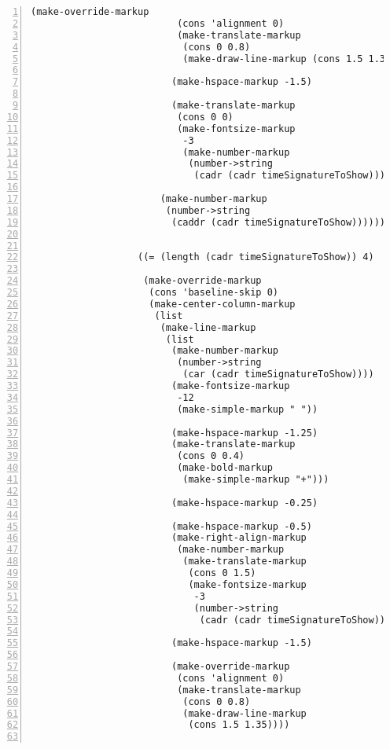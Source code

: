 \begin{Verbatim}[numbers=left,xleftmargin=5mm]
                         (make-override-markup
                          (cons 'alignment 0)
                          (make-translate-markup
                           (cons 0 0.8)
                           (make-draw-line-markup (cons 1.5 1.35))))

                         (make-hspace-markup -1.5)

                         (make-translate-markup
                          (cons 0 0)
                          (make-fontsize-markup
                           -3
                           (make-number-markup
                            (number->string
                             (cadr (cadr timeSignatureToShow))))))))

                       (make-number-markup
                        (number->string
                         (caddr (cadr timeSignatureToShow))))))))


                   ((= (length (cadr timeSignatureToShow)) 4)

                    (make-override-markup
                     (cons 'baseline-skip 0)
                     (make-center-column-markup
                      (list
                       (make-line-markup
                        (list
                         (make-number-markup
                          (number->string
                           (car (cadr timeSignatureToShow))))
                         (make-fontsize-markup
                          -12
                          (make-simple-markup " "))

                         (make-hspace-markup -1.25)
                         (make-translate-markup
                          (cons 0 0.4)
                          (make-bold-markup
                           (make-simple-markup "+")))

                         (make-hspace-markup -0.25)

                         (make-hspace-markup -0.5)
                         (make-right-align-markup
                          (make-number-markup
                           (make-translate-markup
                            (cons 0 1.5)
                            (make-fontsize-markup
                             -3
                             (number->string
                              (cadr (cadr timeSignatureToShow)))))))

                         (make-hspace-markup -1.5)

                         (make-override-markup
                          (cons 'alignment 0)
                          (make-translate-markup
                           (cons 0 0.8)
                           (make-draw-line-markup
                            (cons 1.5 1.35))))


\end{Verbatim}
